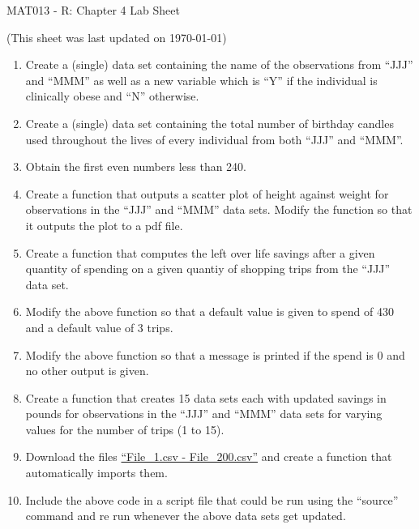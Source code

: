 \documentclass[12pt]{article}
\begin{document}
\begin{center}
\huge{MAT013 - R: Chapter 4 Lab Sheet}\\
\begin{center}
\tiny{(This sheet was last updated on \today)}
\end{center}
\end{center}

\begin{enumerate}
\item Create a (single) data set containing the name of the observations from ``JJJ'' and ``MMM'' as well as a new variable which is ``Y'' if the individual is clinically obese and ``N'' otherwise.
\item Create a (single) data set containing the total number of birthday candles used throughout the lives of every individual from both ``JJJ'' and ``MMM''.
\item Obtain the first even numbers less than 240.
\item Create a function that outputs a scatter plot of height against weight for observations in the ``JJJ''  and ``MMM'' data sets. Modify the function so that it outputs the plot to a pdf file.
\item Create a function that computes the left over life savings after a given quantity of spending on a given quantiy of shopping trips from the ``JJJ'' data set.
\item Modify the above function so that a default value is given to spend of 430 and a default value of 3 trips.
\item Modify the above function so that a message is printed if the spend is 0 and no other output is given.
\item Create a function that creates 15 data sets each with updated savings in pounds for observations in the ``JJJ'' and ``MMM'' data sets for varying values for the number of trips (1 to 15).
\item Download the files \href{https://docs.google.com/file/d/0Bx_zrw5uAafbc3B1WndVdk1FM1E/edit}{``File\_1.csv - File\_200.csv''} and create a function that automatically imports them.
\item Include the above code in a script file that could be run using the ``source'' command and re run whenever the above data sets get updated.
\end{enumerate}
\end{document}
